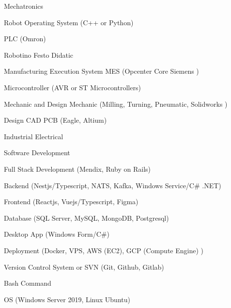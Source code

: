

\begin{cventries}

  \cventry
  {}
  {Mechatronics}
  {}
  {}
  {
    \begin{cvitems} %
      \item {Robot Operating System (C++ or Python)}
      \item {PLC (Omron)}
      \item {Robotino Festo Didatic}
      \item {Manufacturing Execution System MES (Opcenter Core Siemens )}
      \item {Microcontroller (AVR or ST Microcontrollers)}
      \item {Mechanic and Design Mechanic (Milling, Turning, Pneumatic, Solidworks )}
      \item {Design CAD PCB (Eagle, Altium)}
      \item {Industrial Electrical}
    \end{cvitems}
  }
  
  \cventry
  {}
  {Software Development}
  {}
  {}
  {
    \begin{cvitems} %
      \item {Full Stack Development (Mendix, Ruby on Rails)}
      \item {Backend (Nestjs/Typescript, NATS, Kafka, Windows Service/C\# .NET)}
      \item {Frontend (Reactjs, Vuejs/Typescript, Figma)}
      \item {Database (SQL Server, MySQL, MongoDB, Postgresql)}
      \item {Desktop App (Windows Form/C\#)}
      \item {Deployment (Docker, VPS, AWS (EC2), GCP (Compute Engine) )}
      \item {Version Control System or SVN (Git, Github, Gitlab)}
      \item {Bash Command}
      \item {OS (Windows Server 2019, Linux Ubuntu)}
    \end{cvitems}
  }
  
\end{cventries}
